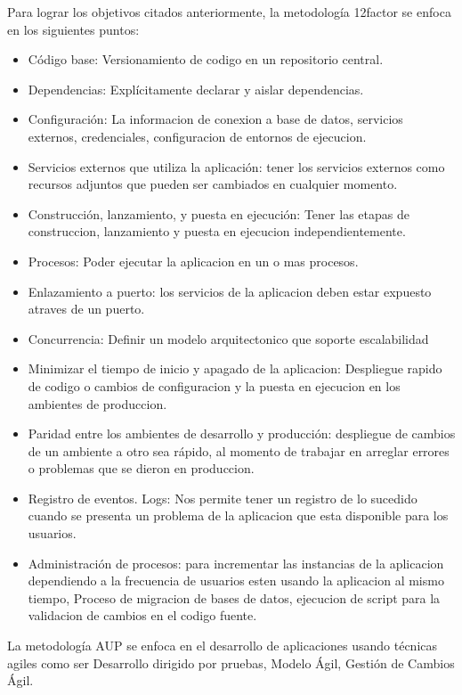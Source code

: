 \noindent Para lograr los objetivos citados anteriormente, la metodología 12factor se enfoca en los siguientes puntos: 
\begin{itemize}
  \item Código base: Versionamiento de codigo en un repositorio central.
  \item Dependencias: Explícitamente declarar y aislar dependencias.
  \item Configuración: La informacion de conexion a base de datos, servicios externos, credenciales, configuracion de entornos de ejecucion. 
  \item Servicios externos que utiliza la aplicación: tener los servicios externos como recursos adjuntos que pueden ser cambiados en cualquier momento.
  \item Construcción, lanzamiento, y puesta en ejecución: Tener las etapas de construccion, lanzamiento y puesta en ejecucion independientemente. 
  \item Procesos: Poder ejecutar la aplicacion en un o mas procesos. 
  \item Enlazamiento a puerto: los servicios de la aplicacion deben estar expuesto atraves de un puerto.
  \item Concurrencia: Definir un modelo arquitectonico que soporte escalabilidad
  \item Minimizar el tiempo de inicio y apagado de la aplicacion: Despliegue rapido de codigo o cambios de configuracion y la puesta en ejecucion en los ambientes de produccion.
  \item Paridad entre los ambientes de desarrollo y producción: despliegue de cambios de un ambiente a otro sea rápido, al momento de trabajar en arreglar errores o problemas que se dieron en produccion.
  \item Registro de eventos. Logs: Nos permite tener un registro de lo sucedido cuando se presenta un problema de la aplicacion que esta disponible para los usuarios.
  \item Administración de procesos: para incrementar las instancias de la aplicacion dependiendo a la frecuencia de usuarios esten usando la aplicacion al mismo tiempo, Proceso de migracion de bases de datos, ejecucion de script para la validacion de cambios en el codigo fuente.
\end{itemize}

\noindent La metodología AUP se enfoca en el desarrollo de aplicaciones usando técnicas agiles como ser Desarrollo dirigido por pruebas,  Modelo Ágil, Gestión de Cambios Ágil.

